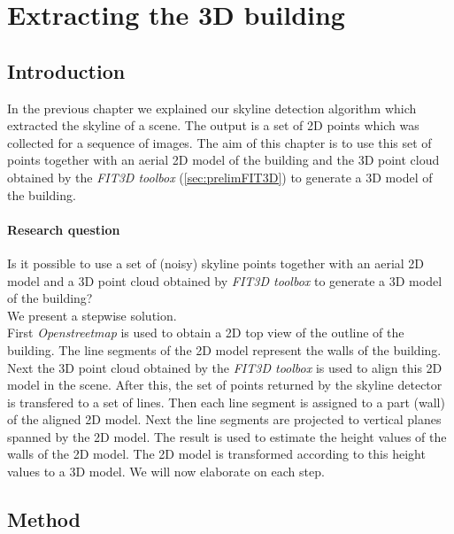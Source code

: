 


\section{Extracting the 3D building}
\label{sec:generate3dModel}
\subsection{Introduction}
In the previous chapter we explained our skyline detection algorithm which
extracted the skyline of a scene. The output is a set of 2D points which was  
collected for a sequence of images.
The aim of this chapter is to use this set of points together with an
 aerial 2D model of the building and the 3D point cloud obtained by the \emph{FIT3D
 toolbox\cite{FIT3D}} (\ref{sec:prelimFIT3D}) to generate a 3D model of the
 building.


\paragraph{Research question}
Is it possible to use a set of (noisy) skyline points together with an aerial
2D model and a 3D point cloud obtained by \emph{FIT3D toolbox\cite{FIT3D}} to
generate a 3D model of the building?\\

We present a stepwise solution.\\ 
First \emph{Openstreetmap\cite{Openstreetmap}} is used to obtain a 2D top view of
the outline of the building. The line segments of the 2D model represent the walls of the building. 
Next the 3D point cloud obtained by the \emph{FIT3D toolbox\cite{FIT3D}} is used to align this 2D
model in the scene.  After this, the set of points returned by the skyline
detector is transfered to a set of lines. Then each line segment is assigned to
a part (wall) of the aligned 2D model.  Next the line segments are
projected to vertical planes spanned by the 2D model.  The result is used to
estimate the height values of the walls of the 2D model. The 2D model is
transformed according to this height values to a 3D
model. We will now elaborate on each step.\\


\subsection{Method}
